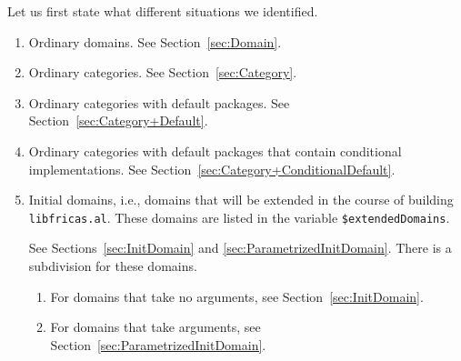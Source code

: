 \documentclass{article}
\newcommand{\file}[1]{\texttt{#1}}
\begin{document}
Let us first state what different situations we identified.
\begin{enumerate}
\item Ordinary domains. See Section~\ref{sec:Domain}.
\item Ordinary categories. See Section~\ref{sec:Category}.
\item Ordinary categories with default packages. See
  Section~\ref{sec:Category+Default}.
\item Ordinary categories with default packages that contain
  conditional implementations. See
  Section~\ref{sec:Category+ConditionalDefault}.
\item Initial domains, i.e., domains that will be extended in the
  course of building \file{libfricas.al}. These domains are listed in
  the variable \verb'$extendedDomains'. %

  See Sections~\ref{sec:InitDomain} and
  \ref{sec:ParametrizedInitDomain}. There is a subdivision for these
  domains.
  \begin{enumerate}
  \item For domains that take no arguments, see
    Section~\ref{sec:InitDomain}.
  \item For domains that take arguments, see
    Section~\ref{sec:ParametrizedInitDomain}.
  \end{enumerate}
\end{enumerate}





\end{document}
